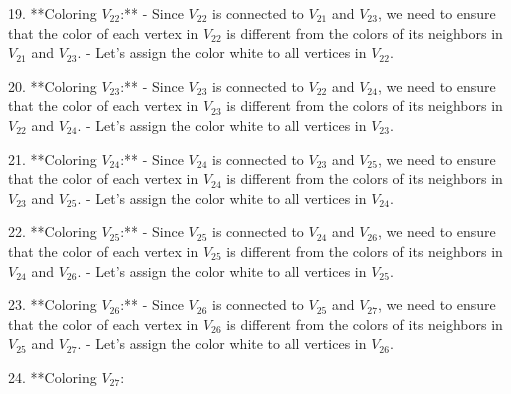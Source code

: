 19. **Coloring \(V_{22}\):**
    - Since \(V_{22}\) is connected to \(V_{21}\) and \(V_{23}\), we need to ensure that the color of each vertex in \(V_{22}\) is different from the colors of its neighbors in \(V_{21}\) and \(V_{23}\).
    - Let's assign the color white to all vertices in \(V_{22}\).

20. **Coloring \(V_{23}\):**
    - Since \(V_{23}\) is connected to \(V_{22}\) and \(V_{24}\), we need to ensure that the color of each vertex in \(V_{23}\) is different from the colors of its neighbors in \(V_{22}\) and \(V_{24}\).
    - Let's assign the color white to all vertices in \(V_{23}\).

21. **Coloring \(V_{24}\):**
    - Since \(V_{24}\) is connected to \(V_{23}\) and \(V_{25}\), we need to ensure that the color of each vertex in \(V_{24}\) is different from the colors of its neighbors in \(V_{23}\) and \(V_{25}\).
    - Let's assign the color white to all vertices in \(V_{24}\).

22. **Coloring \(V_{25}\):**
    - Since \(V_{25}\) is connected to \(V_{24}\) and \(V_{26}\), we need to ensure that the color of each vertex in \(V_{25}\) is different from the colors of its neighbors in \(V_{24}\) and \(V_{26}\).
    - Let's assign the color white to all vertices in \(V_{25}\).

23. **Coloring \(V_{26}\):**
    - Since \(V_{26}\) is connected to \(V_{25}\) and \(V_{27}\), we need to ensure that the color of each vertex in \(V_{26}\) is different from the colors of its neighbors in \(V_{25}\) and \(V_{27}\).
    - Let's assign the color white to all vertices in \(V_{26}\).

24. **Coloring \(V_{27}\):